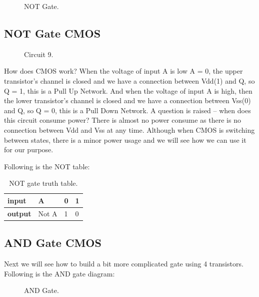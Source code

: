 \begin{figure}[!ht]
    \centering
    
    \caption{NOT Gate.} \label{fig:not}
\end{figure}

\subsection{ NOT Gate CMOS}

\begin{figure}[!ht]
    \centering
    
    \caption{Circuit 9.} \label{fig:circuit9}
\end{figure}

How does CMOS work? When the voltage of input A is low A = 0, the upper
transistor's channel is closed and we have a connection between Vdd(1) and Q, so
Q = 1, this is a Pull Up Network. And when the voltage of input A is high, then
the lower transistor's channel is closed and we have a connection between Vss(0)
and Q, so Q = 0, this is a Pull Down Network. A question is raised – when does
this circuit consume power? There is almost no power consume as there is no
connection between Vdd and Vss at any time. Although when CMOS is switching
between states, there is a minor power usage and we will see how we can use it
for our purpose.

Following is the NOT table:

\begin{table}
    \centering
    \caption{NOT gate truth table.}
    \begin{tabular}{llll}
        \toprule
        \textbf{input}  & A     & 0 & 1 \\ \midrule \textbf{output} & Not A & 1
        & 0 \\ \bottomrule
    \end{tabular}
\end{table} 

\subsection{ AND Gate CMOS}

Next we will see how to build a bit more complicated gate using 4 transistors.
Following is the AND gate diagram:

\begin{figure}[!ht]
    \centering
    
    \caption{AND Gate.} \label{fig:and}
\end{figure}

